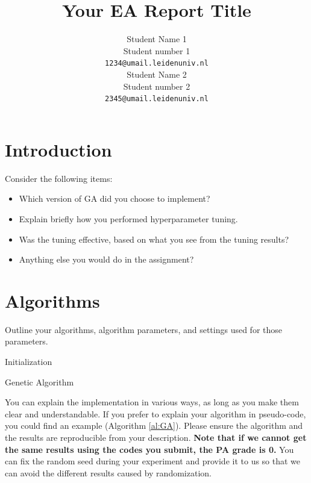 \documentclass{article}
\title{Your EA Report Title}
\author{
 Student Name 1\\
  Student number 1\\
  \texttt{1234@umail.leidenuniv.nl}\\
   \And
 Student Name 2\\
  Student number 2\\
  \texttt{2345@umail.leidenuniv.nl} \\
}
\newcommand{\note}[1]{\textbf{#1}}
\begin{document}
\maketitle




\section{Introduction}\label{sec:intro}
Consider the following items: 
\begin{itemize}
    \item Which version of GA did you choose to implement?
    \item Explain briefly how you performed hyperparameter tuning.
    \item Was the tuning effective, based on what you see from the tuning results?
    \item Anything else you would do in the assignment?
\end{itemize}

\section{Algorithms}
\label{sec:imple}

Outline your algorithms, algorithm parameters, and settings used for those parameters. 

\begin{algorithm}[!ht]
\SetAlgoLined
{}

\BlankLine

Initialization\;

\caption{Genetic Algorithm}\label{al:GA}
\end{algorithm}
 
You can explain the implementation in various ways, as long as you make them clear and understandable. If you prefer to explain your algorithm in pseudo-code, you could find an example (Algorithm \ref{al:GA}). Please ensure the algorithm and the results are reproducible from your description. \note{Note that if we cannot get the same results using the codes you submit, the PA grade is 0.} You can fix the random seed during your experiment and provide it to us so that we can avoid the different results caused by randomization. 
\end{document}
